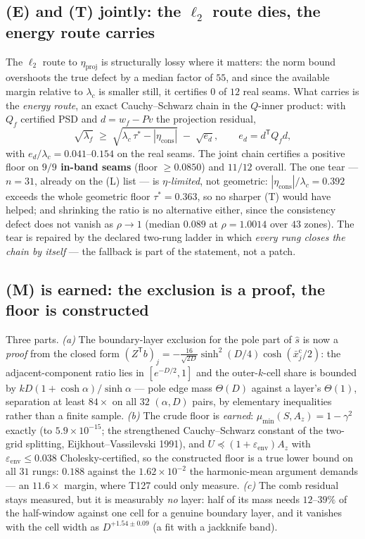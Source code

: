 \documentclass[11pt,a4paper]{article}
\begin{document}
\subsection{(E) and (T) jointly: the $\ell_2$ route dies, the energy route carries}
The $\ell_2$ route to $\eta_{\mathrm{proj}}$ is structurally lossy where it matters: the norm
bound overshoots the true defect by a median factor of $55$, and since the available margin
relative to $\lambda_c$ is smaller still, it certifies $0$ of $12$ real seams. What carries is
the \emph{energy route}, an exact Cauchy--Schwarz chain in the $Q$-inner product: with $Q_f$
certified PSD and $d=w_f-Pv$ the projection residual,
\[
\sqrt{\lambda_f} \;\ge\; \sqrt{\lambda_c\,\tau^* - |\eta_{\mathrm{cons}}|} \;-\; \sqrt{e_d},
\qquad e_d = d^{\mathsf T}Q_f d,
\]
with $e_d/\lambda_c=0.041$--$0.154$ on the real seams. The joint chain certifies a positive floor
on \textbf{$9/9$ in-band seams} (floor $\ge0.0850$) and $11/12$ overall. The one tear --- $n=31$,
already on the (L) list --- is \emph{$\eta$-limited}, not geometric:
$|\eta_{\mathrm{cons}}|/\lambda_c=0.392$ exceeds the whole geometric floor $\tau^*=0.363$, so no
sharper (T) would have helped; and shrinking the ratio is no alternative either, since the
consistency defect does not vanish as $\rho\to1$ (median $0.089$ at $\rho=1.0014$ over $43$
zones). The tear is repaired by the declared two-rung ladder in which \emph{every rung closes the
chain by itself} --- the fallback is part of the statement, not a patch.

\subsection{(M) is earned: the exclusion is a proof, the floor is constructed}
Three parts. \emph{(a)} The boundary-layer exclusion for the pole part of $\hat s$ is now a
\emph{proof} from the closed form
$(Z^{\mathsf T}b)_j=-\tfrac{16}{\sqrt{2D}}\sinh^2(D/4)\cosh(\bar x^{\mathrm c}_j/2)$: the
adjacent-component ratio lies in $[e^{-D/2},1]$ and the outer-$k$-cell share is bounded by
$kD(1+\cosh\alpha)/\sinh\alpha$ --- pole edge mass $\Theta(D)$ against a layer's $\Theta(1)$,
separation at least $84\times$ on all $32$ $(\alpha,D)$ pairs, by elementary inequalities rather
than a finite sample. \emph{(b)} The crude floor is \emph{earned}: $\mu_{\min}(S,A_z)=1-\gamma^2$
exactly (to $5.9\times10^{-15}$; the strengthened Cauchy--Schwarz constant of the two-grid
splitting, Eijkhout--Vassilevski 1991), and $U\preceq(1+\varepsilon_{\mathrm{env}})A_z$ with
$\varepsilon_{\mathrm{env}}\le0.038$ Cholesky-certified, so the constructed floor is a true lower
bound on all $31$ rungs: $\mathbf{0.188}$ against the $1.62\times10^{-2}$ the harmonic-mean
argument demands --- an $11.6\times$ margin, where T127 could only measure. \emph{(c)} The comb
residual stays measured, but it is measurably \emph{no} layer: half of its mass needs
$12$--$39\%$ of the half-window against one cell for a genuine boundary layer, and it vanishes
with the cell width as $D^{+1.54\pm0.09}$ (a fit with a jackknife band).
\end{document}
